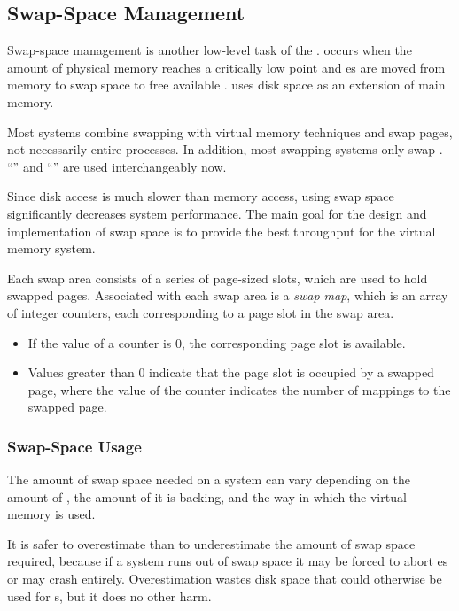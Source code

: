 \subsection{Swap-Space Management}\label{subsec:Swap_Space_Management}
Swap-space management is another low-level task of the .
 occurs when the amount of physical memory reaches a critically low point and es are moved from memory to swap space to free available .
 uses disk space as an extension of main memory.

Most systems combine swapping with virtual memory techniques and swap pages, not necessarily entire processes.
In addition, most swapping systems only swap .
``'' and ``'' are used interchangeably now.

Since disk access is much slower than memory access, using swap space significantly decreases system performance.
The main goal for the design and implementation of swap space is to provide the best throughput for the virtual memory system.

Each swap area consists of a series of page-sized slots, which are used to hold swapped pages.
Associated with each swap area is a \emph{swap map}, which is an array of integer counters, each corresponding to a page slot in the swap area.
\begin{itemize}[noitemsep]
\item If the value of a counter is 0, the corresponding page slot is available.
\item Values greater than 0 indicate that the page slot is occupied by a swapped page, where the value of the counter indicates the number of mappings to the swapped page.
\end{itemize}

\subsubsection{Swap-Space Usage}\label{subsubsec:Swap_Space_Usage}
The amount of swap space needed on a system can vary depending on the amount of , the amount of  it is backing, and the way in which the virtual memory is used.

It is safer to overestimate than to underestimate the amount of swap space required, because if a system runs out of swap space it may be forced to abort es or may crash entirely.
Overestimation wastes disk space that could otherwise be used for s, but it does no other harm.


